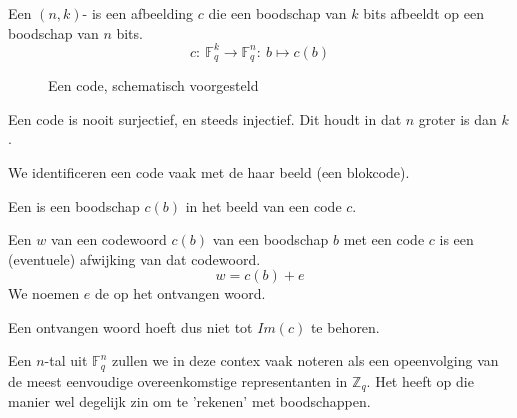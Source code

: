\documentclass[main.tex]{subfiles}
\begin{document}
\begin{de}
  \label{de:code}
  Een $(n,k)$- is een afbeelding $c$ die een boodschap van $k$ bits afbeeldt op een boodschap van $n$ bits.
  \[ c:\ \mathbb{F}_{q}^{k} \rightarrow \mathbb{F}_{q}^{n}:\ b \mapsto c(b) \]

  \begin{figure}[H]
    \centering
    \caption{Een code, schematisch voorgesteld}
    \label{fig:code}
  \end{figure}
  Een code is nooit surjectief, en steeds injectief.
  Dit houdt in dat $n$ groter is dan $k$.
\end{de}

\begin{opm}
  We identificeren een code vaak met de haar beeld (een blokcode).
\end{opm}

\begin{de}
  Een  is een boodschap $c(b)$ in het beeld van een code $c$.
\end{de}

\begin{de}
  Een  $w$ van een codewoord $c(b)$ van een boodschap $b$ met een code $c$ is een (eventuele) afwijking van dat codewoord.
  \[ w = c(b) + e \]
  We noemen $e$ de  op het ontvangen woord.
\end{de}

\begin{opm}
  Een ontvangen woord hoeft dus niet tot $Im(c)$ te behoren.
\end{opm}

\begin{de}
  Een $n$-tal uit $\mathbb{F}_{q}^{n}$ zullen we in deze contex vaak noteren als een opeenvolging van de meest eenvoudige overeenkomstige representanten in $\mathbb{Z}_{q}$.
  Het heeft op die manier wel degelijk zin om te 'rekenen' met boodschappen.
\end{de}
\end{document}
